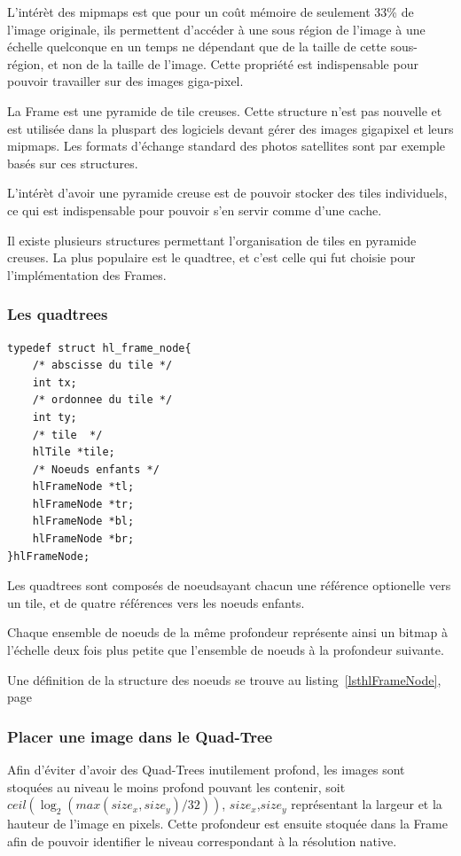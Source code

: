 			L'intérèt des mipmaps est que pour un coût mémoire de seulement 33\% de l'image originale, ils permettent d'accéder à une sous région
			de l'image à une échelle quelconque en un temps ne dépendant que de la taille de cette sous-région, et non de la taille de l'image. 
			Cette propriété est indispensable pour pouvoir travailler sur des images giga-pixel.
			
			La Frame est une pyramide de tile creuses. Cette structure n'est pas nouvelle et est utilisée dans la pluspart des logiciels devant
			gérer des images gigapixel et leurs mipmaps. Les formats d'échange standard des photos satellites sont par exemple basés sur ces structures.
			
			L'intérèt d'avoir une pyramide creuse est de pouvoir stocker des tiles individuels, ce qui est indispensable pour pouvoir s'en servir
			comme d'une cache.

			Il existe plusieurs structures permettant l'organisation de tiles en pyramide creuses. La plus populaire est le quadtree, et c'est celle
			qui fut choisie pour l'implémentation des Frames.

			\subsubsection{Les quadtrees}
		\begin{lstlisting}[float,caption={Définition des hlFrameNodes},frame=tb,label=lsthlFrameNode]
typedef struct hl_frame_node{
	/* abscisse du tile */
	int tx;
	/* ordonnee du tile */
	int ty;
	/* tile  */
	hlTile *tile;
	/* Noeuds enfants */
	hlFrameNode *tl;
	hlFrameNode *tr;
	hlFrameNode *bl;
	hlFrameNode *br;
}hlFrameNode;
		\end{lstlisting}
				Les quadtrees sont composés de noeudsayant chacun une référence optionelle vers un tile, et de quatre références vers
				les noeuds enfants. 

				Chaque ensemble de noeuds de la même profondeur représente ainsi un bitmap à l'échelle deux fois plus petite que l'ensemble de
				noeuds à la profondeur suivante.

				Une définition de la structure des noeuds se trouve au listing~\ref{lsthlFrameNode}, page~\pageref{lsthlFrameNode}

			\subsubsection{Placer une image dans le Quad-Tree}
				Afin d'éviter d'avoir des Quad-Trees inutilement profond, les images sont stoquées au niveau le moins profond pouvant les contenir,
				soit $ceil( \log_2( max(size_x,size_y)/32))$, $size_x$,$size_y$ représentant la largeur et la hauteur de l'image en pixels.
				Cette profondeur est ensuite stoquée dans la Frame afin de pouvoir identifier le niveau correspondant à la résolution native.

